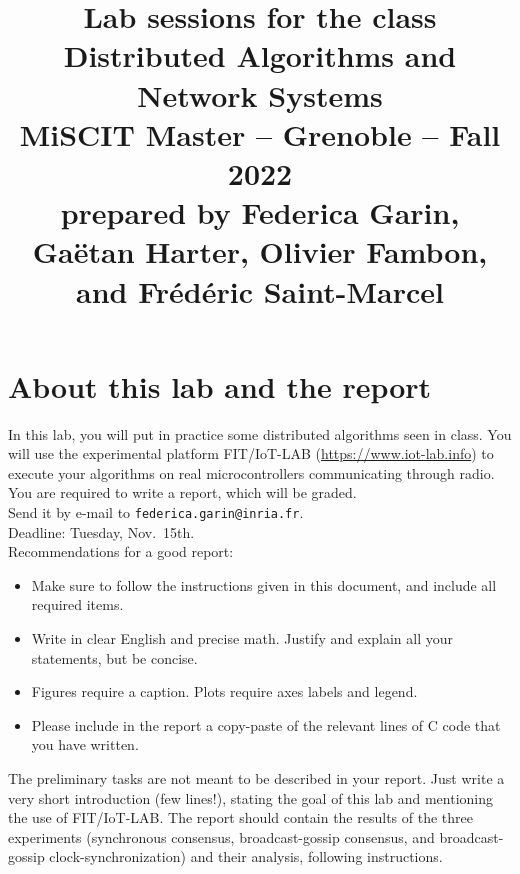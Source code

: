 \documentclass[oneside]{article}
\begin{document}
\title{
{\normalsize Lab sessions for the class}\\[-1mm]
Distributed Algorithms and Network Systems\\[-1mm]
{\normalsize MiSCIT Master -- Grenoble -- Fall 2022}\\[-1mm]
{\normalsize prepared by Federica Garin, Ga\"{e}tan Harter,  Olivier Fambon, and Fr\'ed\'eric Saint-Marcel}}
\date{}
\maketitle



\section{About this lab and the report}
In this lab, you will put in practice some distributed algorithms seen in class.
You will use the experimental platform FIT/IoT-LAB (\url{https://www.iot-lab.info})
to execute your algorithms on real microcontrollers communicating through radio.\\

You are required to write a report, which will be graded.\\ Send it by e-mail to \texttt{federica.garin@inria.fr}.\\
Deadline: Tuesday, Nov.~15th.\\

Recommendations for a good report:
\begin{itemize}
\item Make sure to follow the instructions given in this document, and include all required items.
\item Write in clear English and precise math. Justify and explain all your statements, but be concise.
\item Figures require a caption. Plots require axes labels and legend.
\item Please include in the report a copy-paste of the relevant lines of C code that you have written.
\end{itemize}

The preliminary tasks are not meant to be described in your report. Just write a very short introduction (few lines!), stating the goal of this lab and mentioning the use of FIT/IoT-LAB.
The report should contain the results of the three experiments (synchronous consensus, broadcast-gossip consensus, and broadcast-gossip clock-synchronization) and their analysis, following instructions.
\end{document}
